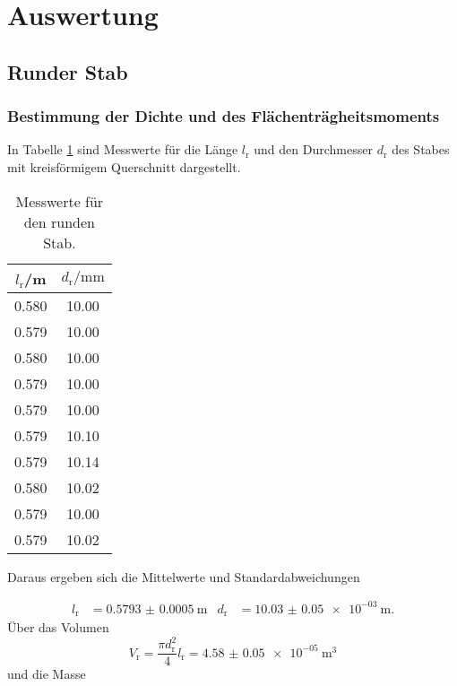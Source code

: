 \section{Auswertung}
\label{sec:Auswertung}

\subsection{Runder Stab}

\subsubsection{Bestimmung der Dichte und des Flächenträgheitsmoments}

In Tabelle \ref{tab:Dichterund} sind Messwerte für die Länge $l_\text{r}$ und
den Durchmesser $d_\text{r}$ des Stabes mit
kreisförmigem Querschnitt dargestellt.

\begin{table}[H]
  \centering
  \caption{Messwerte für den runden Stab.}
  \label{tab:Dichterund}
  \begin{tabular}{c c}
    \toprule
    $l_\text{r}$/\si{\meter} & $d_\text{r}/\si{\milli\meter}$ \\
    \midrule
    0.580 & 10.00 \\
    0.579 & 10.00 \\
    0.580 & 10.00 \\
    0.579 & 10.00 \\
    0.579 & 10.00 \\
    0.579 & 10.10 \\
    0.579 & 10.14 \\
    0.580 & 10.02 \\
    0.579 & 10.00 \\
    0.579 & 10.02 \\
    \bottomrule
  \end{tabular}
\end{table}

Daraus ergeben sich die Mittelwerte und Standardabweichungen

\begin{align}
  l_\text{r} & = \SI{0.5793(5)}{\meter} & d_\text{r} & = \SI{10.03(5)e-03}{\meter}.
\end{align}
Über das Volumen
\begin{equation}
  V_\text{r} = \frac{\pi d_\text{r}^2}{4} l_\text{r} = \SI{4.58(5)e-05}{\cubic\meter}
\end{equation}
und die Masse

